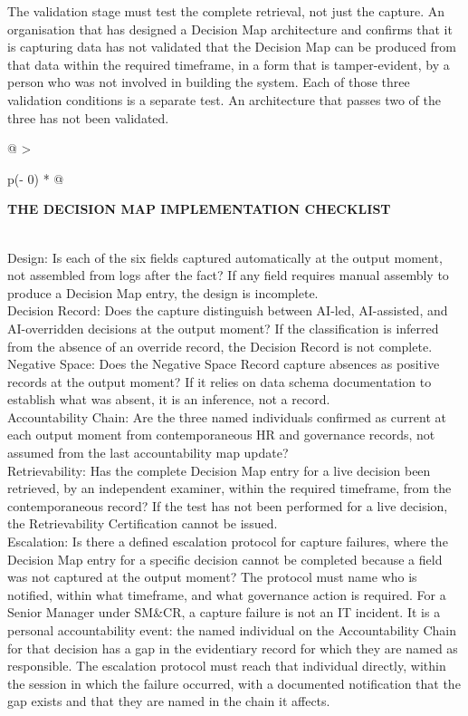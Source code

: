 The validation stage must test the complete retrieval, not just the capture. An organisation that has designed a Decision Map architecture and confirms that it is capturing data has not validated that the Decision Map can be produced from that data within the required timeframe, in a form that is tamper-evident, by a person who was not involved in building the system. Each of those three validation conditions is a separate test. An architecture that passes two of the three has not been validated.

\begin{longtable}[]{@{}
  >{\raggedright\arraybackslash}p{(\columnwidth - 0\tabcolsep) * }@{}}
\toprule\noalign{}
\begin{minipage}[b]{\linewidth}\raggedright
\textbf{THE DECISION MAP IMPLEMENTATION CHECKLIST}
\end{minipage} \\
\midrule\noalign{}
\endhead
\bottomrule\noalign{}
\endlastfoot
Design: Is each of the six fields captured automatically at the output moment, not assembled from logs after the fact? If any field requires manual assembly to produce a Decision Map entry, the design is incomplete. \\
Decision Record: Does the capture distinguish between AI-led, AI-assisted, and AI-overridden decisions at the output moment? If the classification is inferred from the absence of an override record, the Decision Record is not complete. \\
Negative Space: Does the Negative Space Record capture absences as positive records at the output moment? If it relies on data schema documentation to establish what was absent, it is an inference, not a record. \\
Accountability Chain: Are the three named individuals confirmed as current at each output moment from contemporaneous HR and governance records, not assumed from the last accountability map update? \\
Retrievability: Has the complete Decision Map entry for a live decision been retrieved, by an independent examiner, within the required timeframe, from the contemporaneous record? If the test has not been performed for a live decision, the Retrievability Certification cannot be issued. \\
Escalation: Is there a defined escalation protocol for capture failures, where the Decision Map entry for a specific decision cannot be completed because a field was not captured at the output moment? The protocol must name who is notified, within what timeframe, and what governance action is required. For a Senior Manager under SM\&CR, a capture failure is not an IT incident. It is a personal accountability event: the named individual on the Accountability Chain for that decision has a gap in the evidentiary record for which they are named as responsible. The escalation protocol must reach that individual directly, within the session in which the failure occurred, with a documented notification that the gap exists and that they are named in the chain it affects. \\
\end{longtable}

